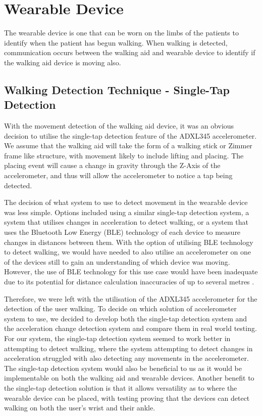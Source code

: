     \section{Wearable Device}
    \label{sec:wearabledevice}

        The wearable device is one that can be worn on the limbs of the patients to identify when the patient has begun walking. When walking is detected, communication occurs between the walking aid and wearable device to identify if the walking aid device is moving also. 

        \subsection{Walking Detection Technique - Single-Tap Detection}
        \label{subsec:walking_detection_technique}

           With the movement detection of the walking aid device, it was an obvious decision to utilise the single-tap detection feature of the ADXL345 accelerometer. We assume that the walking aid will take the form of a walking stick or Zimmer frame like structure, with movement likely to include lifting and placing. The placing event will cause a change in gravity through the Z-Axis of the accelerometer, and thus will allow the accelerometer to notice a tap being detected.

           The decision of what system to use to detect movement in the wearable device was less simple. Options included using a similar single-tap detection system, a system that utilises changes in acceleration to detect walking, or a system that uses the Bluetooth Low Energy (BLE) technology of each device to measure changes in distances between them. With the option of utilising BLE technology to detect walking, we would have needed to also utilise an accelerometer on one of the devices still to gain an understanding of which device was moving. However, the use of BLE technology for this use case would have been inadequate due to its potential for distance calculation inaccuracies of up to several metres \cite{Fachri_2019}. 

           Therefore, we were left with the utilisation of the ADXL345 accelerometer for the detection of the user walking. To decide on which solution of accelerometer system to use, we decided to develop both the single-tap detection system and the acceleration change detection system and compare them in real world testing. For our system, the single-tap detection system seemed to work better in attempting to detect walking, where the system attempting to detect changes in acceleration struggled with also detecting any movements in the accelerometer. The single-tap detection system would also be beneficial to us as it would be implementable on both the walking aid and wearable devices. Another benefit to the single-tap detection solution is that it allows versatility as to where the wearable device can be placed, with testing proving that the devices can detect walking on both the user's wrist and their ankle. 

